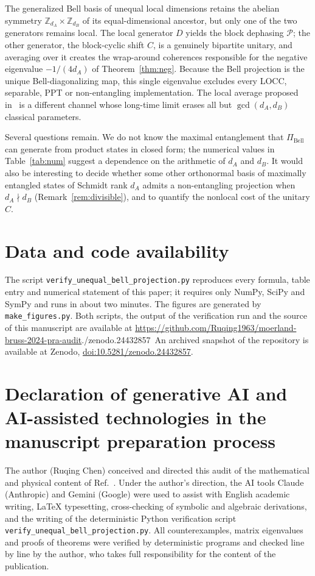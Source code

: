 \documentclass[11pt,a4paper]{article}
\theoremstyle{definition}
\theoremstyle{remark}
\newcommand{\dA}{d_A}
\newcommand{\dB}{d_B}
\newcommand{\PiB}{\Pi_{\mathrm{Bell}}}
\newcommand{\cP}{\mathcal{P}}
\newcommand{\zenodoDOI}{10.5281/zenodo.24432857}
\newcommand{\zenodonote}{\ifx\zenodoDOI\empty\else\ An archived snapshot of the repository
is available at Zenodo, \href{https://doi.org/\zenodoDOI}{doi:\zenodoDOI}.\fi}
\begin{document}
The generalized Bell basis of unequal local dimensions retains the abelian symmetry
$\mathbb{Z}_{\dA}\times\mathbb{Z}_{\dB}$ of its equal-dimensional ancestor, but only one of
the two generators remains local. The local generator $D$ yields the block dephasing
$\cP$; the other generator, the block-cyclic shift $C$, is a genuinely bipartite unitary,
and averaging over it creates the wrap-around coherences responsible for the negative
eigenvalue $-1/(4\dA)$ of Theorem~\ref{thm:neg}. Because the Bell projection is the unique
Bell-diagonalizing map, this single eigenvalue excludes every LOCC, separable, PPT or
non-entangling implementation. The local average proposed in~\cite{MWKB24} is a different
channel whose long-time limit erases all but $\gcd(\dA,\dB)$ classical parameters.

Several questions remain. We do not know the maximal entanglement that $\PiB$ can generate
from product states in closed form; the numerical values in Table~\ref{tab:num} suggest a
dependence on the arithmetic of $\dA$ and $\dB$. It would also be interesting to decide
whether some other orthonormal basis of maximally entangled states of Schmidt rank $\dA$
admits a non-entangling projection when $\dA\nmid\dB$ (Remark~\ref{rem:divisible}), and to
quantify the nonlocal cost of the unitary $C$.

\section*{Data and code availability}

The script \texttt{verify\_unequal\_bell\_projection.py} reproduces every formula, table
entry and numerical statement of this paper; it requires only NumPy, SciPy and SymPy and
runs in about two minutes. The figures are generated by \texttt{make\_figures.py}. Both
scripts, the output of the verification run and the source of this manuscript are
available at
\url{https://github.com/Ruqing1963/moerland-bruss-2024-pra-audit}.\zenodonote

\section*{Declaration of generative AI and AI-assisted technologies in the manuscript preparation process}

The author (Ruqing Chen) conceived and directed this audit of the mathematical and
physical content of Ref.~\cite{MWKB24}. Under the author's direction, the AI tools Claude
(Anthropic) and Gemini (Google) were used to assist with English academic writing,
\LaTeX{} typesetting, cross-checking of symbolic and algebraic derivations, and the
writing of the deterministic Python verification script
\texttt{verify\_unequal\_bell\_projection.py}. All counterexamples, matrix eigenvalues and
proofs of theorems were verified by deterministic programs and checked line by line by
the author, who takes full responsibility for the content of the publication.
\end{document}
